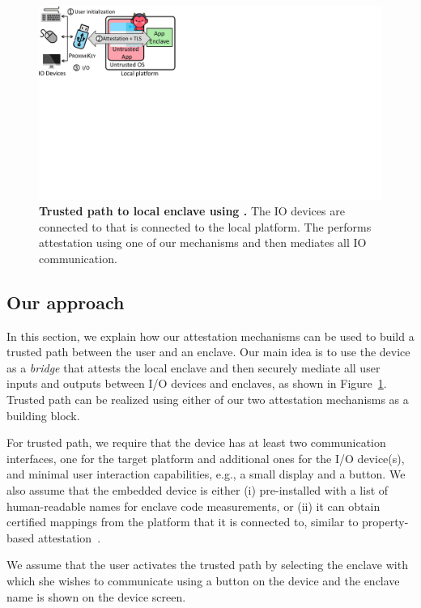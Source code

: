 \begin{figure}[t]
 \centering
 \includegraphics[trim={0 12cm 20cm 0},clip,width=0.65\linewidth]{chapters/ProximiTEE/images_new/trustedPath.pdf}
 \caption[Trusted path to local enclave using \device]{\textbf{Trusted path to local enclave using \device.} The IO devices are connected to \device that is connected to the local platform. The \device performs attestation using one of our mechanisms and then mediates all IO communication.}

 \label{fig:secureInput}
\end{figure}

\subsection{Our approach}

In this section, we explain how our attestation mechanisms can be used to build a trusted path between the user and an enclave. Our main idea is to use the \device device as a \emph{bridge} that attests the local enclave and then securely mediate all user inputs and outputs between I/O devices and enclaves, as shown in Figure~\ref{fig:secureInput}. Trusted path can be realized using either of our two attestation mechanisms as a building block.

For trusted path, we require that the \device device has at least two communication interfaces, one for the target platform and additional ones for the I/O device(s), and minimal user interaction capabilities, e.g., a small display and a button. We also assume that the embedded device is either (i) pre-installed with a list of human-readable names for enclave code measurements, or (ii) it can obtain certified mappings from the platform that it is connected to, similar to property-based attestation~\cite{SadeghiProperty}.

We assume that the user activates the trusted path by selecting the enclave with which she wishes to communicate using a button on the device and the enclave name is shown on the device screen.%


